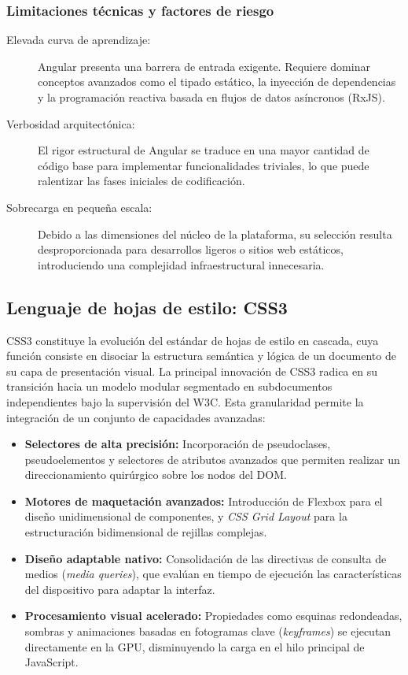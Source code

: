 \subsubsection{Limitaciones técnicas y factores de riesgo}
\begin{description}
    \item[Elevada curva de aprendizaje:] Angular presenta una barrera de entrada exigente. Requiere dominar conceptos avanzados como el tipado estático, la inyección de dependencias y la programación reactiva basada en flujos de datos asíncronos (RxJS).
    \item[Verbosidad arquitectónica:] El rigor estructural de Angular se traduce en una mayor cantidad de código base para implementar funcionalidades triviales, lo que puede ralentizar las fases iniciales de codificación.
    \item[Sobrecarga en pequeña escala:] Debido a las dimensiones del núcleo de la plataforma, su selección resulta desproporcionada para desarrollos ligeros o sitios web estáticos, introduciendo una complejidad infraestructural innecesaria.
\end{description}

\subsection{Lenguaje de hojas de estilo: CSS3}
CSS3 constituye la evolución del estándar de hojas de estilo en cascada, cuya función consiste en disociar la estructura semántica y lógica de un documento de su capa de presentación visual. La principal innovación de CSS3 radica en su transición hacia un modelo modular segmentado en subdocumentos independientes bajo la supervisión del W3C. Esta granularidad permite la integración de un conjunto de capacidades avanzadas:

\begin{itemize}
    \item \textbf{Selectores de alta precisión:} Incorporación de pseudoclases, pseudoelementos y selectores de atributos avanzados que permiten realizar un direccionamiento quirúrgico sobre los nodos del DOM.
    \item \textbf{Motores de maquetación avanzados:} Introducción de Flexbox para el diseño unidimensional de componentes, y \textit{CSS Grid Layout} para la estructuración bidimensional de rejillas complejas.
    \item \textbf{Diseño adaptable nativo:} Consolidación de las directivas de consulta de medios (\textit{media queries}), que evalúan en tiempo de ejecución las características del dispositivo para adaptar la interfaz.
    \item \textbf{Procesamiento visual acelerado:} Propiedades como esquinas redondeadas, sombras y animaciones basadas en fotogramas clave (\textit{keyframes}) se ejecutan directamente en la GPU, disminuyendo la carga en el hilo principal de JavaScript.
\end{itemize}

